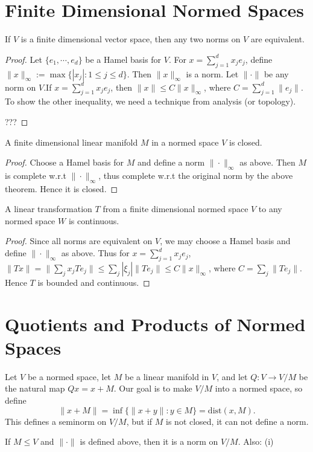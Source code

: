 \section{Finite Dimensional Normed Spaces}
\begin{theorem}
    If $V$ is a finite dimensional vector space, then any two norms on $V$ are equivalent.
\end{theorem}
\begin{proof}
    Let $\{ e_1,\cdots,e_d\}$ be a Hamel basis for $V$. For $x=\sum_{j=1}^{d}x_je_j$, define $\|x\|_\infty:=\max\{|x_j|:1\le j\le d\}$.
    Then $\|x\|_\infty$ is a norm. Let $\|\cdot\|$ be any norm on $V$.If $x=\sum_{j=1}^{d}x_je_j$, then $\|x\|\le C\|x\|_\infty$, 
    where $C=\sum_{j=1}^{d}\|e_j\|$. To show the other inequality, we need a technique from analysis (or topology).

    ???
\end{proof}
\begin{corollary}
    A finite dimensional linear manifold $M$ in a normed space $V$ is closed.
\end{corollary}
\begin{proof}
    Choose a Hamel basis for $M$ and define a norm $\|\cdot\|_\infty$ as above. Then $M$ is complete w.r.t $\|\cdot\|_\infty$,
    thus complete w.r.t the original norm by the above theorem. Hence it is closed.
\end{proof}
\begin{corollary}
    A linear transformation $T$ from a finite dimensional normed space $V$ to any normed space $W$ is continuous.
\end{corollary}
\begin{proof}
    Since all norms are equivalent on $V$, we may choose a Hamel basis and define $\|\cdot\|_\infty$ as above.
    Thus for $x=\sum_{j=1}^{d}x_je_j$, $\|Tx\|=\|\sum_j x_j Te_j\|\le \sum_j |\xi_j| \|Te_j\|\le C\|x\|_\infty$, where $C=\sum_j \|Te_j\|$.
    Hence $T$ is bounded and continuous.
\end{proof}

\section{Quotients and Products of Normed Spaces}
Let $V$ be a normed space, let $M$ be a linear manifold in $V$, and let $Q:V\to V/M$ be the natural map $Qx=x+M$.
Our goal is to make $V/M$ into a normed space, so define \[\|x+M\|=\inf \{\|x+y\|:y\in M\}=\text{dist}(x,M).\]
This defines a seminorm on $V/M$, but if $M$ is not closed, it can not define a norm.
\begin{theorem}
    If $M\le V$ and $\|\cdot\|$ is defined above, then it is a norm on $V/M$. Also:\newline 
    (i)
\end{theorem}

